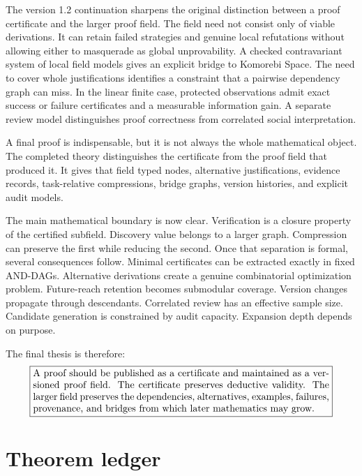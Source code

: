 \documentclass[11pt,oneside]{article}
\theoremstyle{definition}
\theoremstyle{remark}
\begin{document}
The version 1.2 continuation sharpens the original distinction between a proof certificate and the larger proof field. The field need not consist only of viable derivations. It can retain failed strategies and genuine local refutations without allowing either to masquerade as global unprovability. A checked contravariant system of local field models gives an explicit bridge to Komorebi Space. The need to cover whole justifications identifies a constraint that a pairwise dependency graph can miss. In the linear finite case, protected observations admit exact success or failure certificates and a measurable information gain. A separate review model distinguishes proof correctness from correlated social interpretation.



A final proof is indispensable, but it is not always the whole mathematical object. The completed theory distinguishes the certificate from the proof field that produced it. It gives that field typed nodes, alternative justifications, evidence records, task-relative compressions, bridge graphs, version histories, and explicit audit models.

The main mathematical boundary is now clear. Verification is a closure property of the certified subfield. Discovery value belongs to a larger graph. Compression can preserve the first while reducing the second. Once that separation is formal, several consequences follow. Minimal certificates can be extracted exactly in fixed AND-DAGs. Alternative derivations create a genuine combinatorial optimization problem. Future-reach retention becomes submodular coverage. Version changes propagate through descendants. Correlated review has an effective sample size. Candidate generation is constrained by audit capacity. Expansion depth depends on purpose.

The final thesis is therefore:
\[
\boxed{\begin{minipage}{0.88\linewidth}
A proof should be published as a certificate and maintained as a versioned proof field. The certificate preserves deductive validity. The larger field preserves the dependencies, alternatives, examples, failures, provenance, and bridges from which later mathematics may grow.
\end{minipage}}
\]

\appendix

\section{Theorem ledger}
\end{document}
